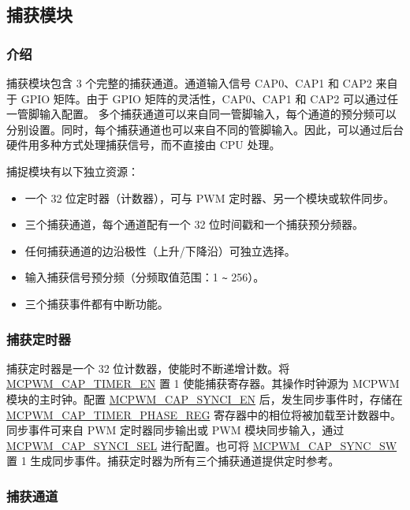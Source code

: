 \documentclass[main\_\_CN.tex]{subfiles}
\begin{document}
\subsection{捕获模块}
\subsubsection{介绍}
捕获模块包含 3 个完整的捕获通道。通道输入信号 CAP0、CAP1 和 CAP2 来自于 GPIO 矩阵。由于 GPIO 矩阵的灵活性，CAP0、CAP1 和 CAP2 可以通过任一管脚输入配置。 多个捕获通道可以来自同一管脚输入，每个通道的预分频可以分别设置。同时，每个捕获通道也可以来自不同的管脚输入。因此，可以通过后台硬件用多种方式处理捕获信号，而不直接由 CPU 处理。

捕捉模块有以下独立资源：
\begin{itemize}
    \item  一个 32 位定时器（计数器），可与 PWM 定时器、另一个模块或软件同步。
    \item 三个捕获通道，每个通道配有一个 32 位时间戳和一个捕获预分频器。
    \item 任何捕获通道的边沿极性（上升/下降沿）可独立选择。
    \item 输入捕获信号预分频（分频取值范围：1 \verb+~+ 256）。
    \item 三个捕获事件都有中断功能。
\end{itemize}

\subsubsection{捕获定时器}
 捕获定时器是一个 32 位计数器，使能时不断递增计数。将 \hyperref[fielddesc:MCPWMCAPTIMEREN]{MCPWM\_CAP\_TIMER\_EN} 置 1 使能捕获寄存器。其操作时钟源为 MCPWM 模块的主时钟。配置 \hyperref[fielddesc:MCPWMCAPSYNCIEN]{MCPWM\_CAP\_SYNCI\_EN} 后，发生同步事件时，存储在\\ \hyperref[regdesc:MCPWMCAPTIMERPHASEREG]{MCPWM\_CAP\_TIMER\_PHASE\_REG} 寄存器中的相位将被加载至计数器中。同步事件可来自 PWM 定时器同步输出或 PWM 模块同步输入，通过 \hyperref[fielddesc:MCPWMCAPSYNCISEL]{MCPWM\_CAP\_SYNCI\_SEL} 进行配置。也可将 \hyperref[fielddesc:MCPWMCAPSYNCSW]{MCPWM\_CAP\_SYNC\_SW} 置 1 生成同步事件。捕获定时器为所有三个捕获通道提供定时参考。

\subsubsection{捕获通道}
\end{document}
